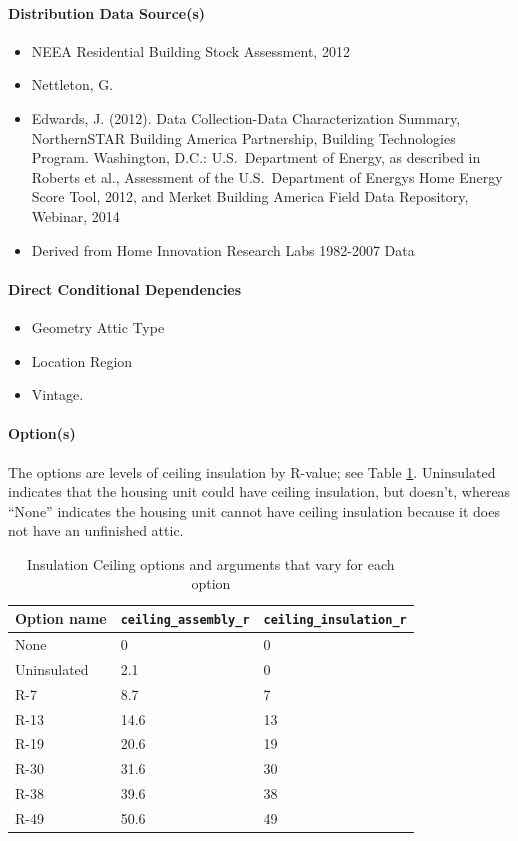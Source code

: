 \paragraph{Distribution Data Source(s)}
\begin{itemize}
 
\item
  NEEA Residential Building Stock Assessment, 2012
\item
  Nettleton, G.
\item
  Edwards, J. (2012). Data Collection-Data Characterization Summary,
  NorthernSTAR Building America Partnership, Building Technologies
  Program. Washington, D.C.: U.S.~Department of Energy, as described in
  Roberts et al., \textquotesingle Assessment of the U.S.~Department of
  Energy\textquotesingle s Home Energy Score Tool\textquotesingle, 2012,
  and Merket \textquotesingle Building America Field Data
  Repository\textquotesingle, Webinar, 2014
\item
  Derived from Home Innovation Research Labs 1982-2007 Data
\end{itemize}
\paragraph{Direct Conditional Dependencies}

\begin{itemize}
    \item Geometry Attic Type
    \item Location Region
    \item Vintage.
\end{itemize}
\paragraph{Option(s)}
The options are levels of ceiling insulation by R-value; see Table \ref{table:hc_opt_ins_ceil}. Uninsulated indicates that the housing unit could have ceiling insulation, but doesn't, whereas ``None'' indicates the housing unit cannot have ceiling insulation because it does not have an unfinished attic. 

\begin{longtable}[]{|p{3.5cm}|p{3.3cm}|p{3.3cm}|} \caption{Insulation Ceiling options and arguments that vary for each option} \label{table:hc_opt_ins_ceil} \\  
\toprule\noalign{}
Option name & \texttt{ceiling\_assembly\_r} &
\texttt{ceiling\_insulation\_r} \\
\midrule\noalign{}
\endhead
\bottomrule\noalign{}
\endlastfoot
None & 0 & 0 \\
Uninsulated & 2.1 & 0 \\
R-7 & 8.7 & 7 \\
R-13 & 14.6 & 13 \\
R-19 & 20.6 & 19 \\
R-30 & 31.6 & 30 \\
R-38 & 39.6 & 38 \\
R-49 & 50.6 & 49 \\
\end{longtable}
 
